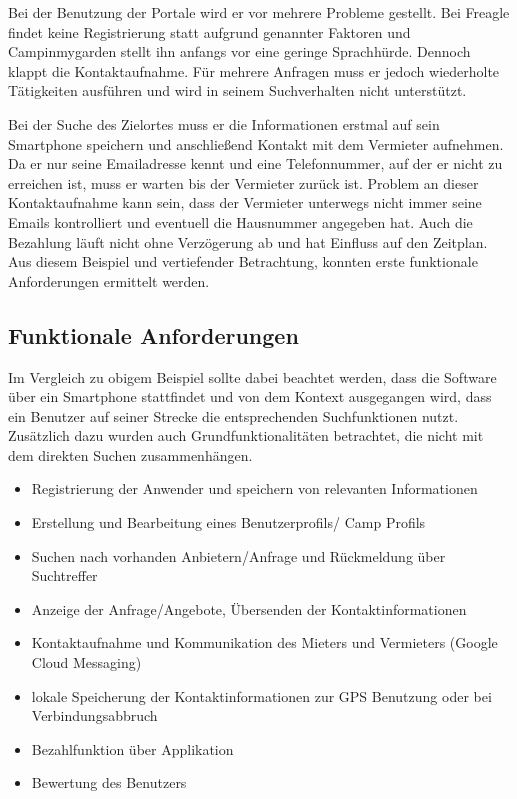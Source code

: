 Bei der Benutzung der Portale wird er vor mehrere Probleme gestellt. Bei Freagle findet keine Registrierung statt aufgrund genannter Faktoren und Campinmygarden stellt ihn anfangs vor eine geringe Sprachhürde. Dennoch klappt die Kontaktaufnahme. Für mehrere Anfragen muss er jedoch wiederholte Tätigkeiten ausführen und wird in seinem Suchverhalten nicht unterstützt.

Bei der Suche des Zielortes muss er die Informationen erstmal auf sein Smartphone speichern und anschließend Kontakt mit dem Vermieter aufnehmen. Da er nur seine Emailadresse kennt und eine Telefonnummer, auf der er nicht zu erreichen ist, muss er warten bis der Vermieter zurück ist. 
Problem an dieser Kontaktaufnahme kann sein, dass der Vermieter unterwegs nicht immer seine Emails kontrolliert und eventuell die Hausnummer angegeben hat. Auch die Bezahlung läuft nicht ohne Verzögerung ab und hat Einfluss auf den Zeitplan.\\

Aus diesem Beispiel und vertiefender Betrachtung, konnten erste funktionale Anforderungen ermittelt werden.
        	

\subsection{Funktionale Anforderungen}        	
Im Vergleich zu obigem Beispiel sollte dabei beachtet werden, dass die Software über ein Smartphone stattfindet und von dem Kontext ausgegangen wird, dass ein Benutzer auf seiner Strecke die entsprechenden Suchfunktionen nutzt. Zusätzlich dazu wurden auch Grundfunktionalitäten betrachtet, die nicht mit dem direkten Suchen zusammenhängen.

\begin{itemize}
   \item 
   Registrierung der Anwender und speichern von relevanten Informationen
   \item
   Erstellung und Bearbeitung eines Benutzerprofils/ Camp Profils
   \item 
   Suchen nach vorhanden Anbietern/Anfrage und Rückmeldung über Suchtreffer
   \item 
   Anzeige der Anfrage/Angebote, Übersenden der Kontaktinformationen 
   \item
   Kontaktaufnahme und Kommunikation des Mieters und Vermieters (Google Cloud Messaging)
   \item
   lokale Speicherung der Kontaktinformationen zur GPS Benutzung oder bei Verbindungsabbruch
   \item
   Bezahlfunktion über Applikation
   \item
   Bewertung des Benutzers

\end{itemize}

